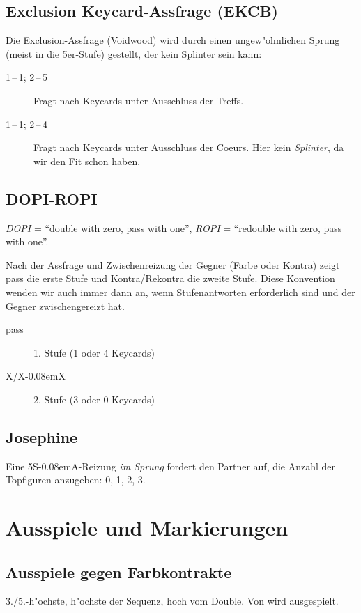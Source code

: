 \documentclass[11pt,german,twocolumn,twoside]{scrartcl}
\def\sa{\nobreak\textsf{S\kern-0.08emA}\xspace}
\def\pik{\nobreak\hspace{\cardskip}\Sp\xspace}
\def\coe{\nobreak\hspace{\cardskip}\He\xspace}
\def\kar{\nobreak\hspace{\cardskip}\Di\xspace}
\def\tre{\nobreak\hspace{\cardskip}\Cl\xspace}
\def\SA{\nobreak\hspace{\cardskip}\sa}
\def\kontra{\textsf{X}\xspace}
\def\rekontra{\textsf{X\kern-0.08emX}\xspace}
\def\sep{\,--\,}
\newcommand{\conv}[1]{\emph{#1}}
\def\bdsc{\begin{description}}
\def\edsc{\end{description}}
\newcommand{\Index}[1]{#1\index{#1}}
\begin{document}
\subsection{Exclusion Keycard-Assfrage (EKCB)}

Die Exclusion-Assfrage (Voidwood) wird durch einen ungew"ohnlichen Sprung
(meist in die 5er-Stufe) gestellt, der kein \Index{Splinter} sein kann:
%
\bdsc
\item[1\coe{}\sep1\pik; 2\coe{}\sep5\tre] Fragt nach Keycards unter
  Ausschluss der Treffs.
\item[1\tre{}\sep1\kar; 2\kar{}\sep4\coe] Fragt nach Keycards unter
  Ausschluss der Coeurs. Hier kein \conv{Splinter}, da wir den Fit schon
  haben.  \edsc

\subsection{\Index{DOPI-ROPI}}

\conv{DOPI} = ``double with zero, pass with one'', \conv{ROPI} =
``redouble with zero, pass with one''.

Nach der Assfrage und Zwischenreizung der Gegner (Farbe oder Kontra) zeigt pass
die erste Stufe und Kontra/Rekontra die zweite Stufe. Diese Konvention wenden
wir auch immer dann an, wenn Stufenantworten erforderlich sind und der Gegner
zwischengereizt hat.
%
\bdsc
  \item[pass] 1. Stufe (1 oder 4 Keycards)
  \item[\kontra/\rekontra] 2. Stufe (3 oder 0 Keycards)
\edsc

\subsection{Josephine}

Eine 5\SA-Reizung \emph{im Sprung} fordert den Partner auf, die Anzahl der
Topfiguren anzugeben: 0, 1, 2, 3.

\newpage
\section{Ausspiele und Markierungen}

\subsection{Ausspiele gegen Farbkontrakte}

3./5.-h"ochste, h"ochste der Sequenz, hoch vom Double.
Von  wird  ausgespielt.
\end{document}
